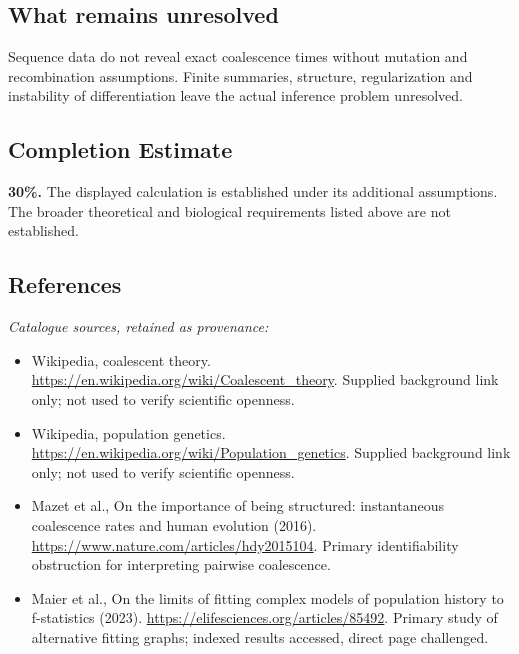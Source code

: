 \documentclass[11pt]{article}
\begin{document}
\subsection{What remains unresolved}
Sequence data do not reveal exact coalescence times without mutation and recombination assumptions. Finite summaries, structure, regularization and instability of differentiation leave the actual inference problem unresolved.
\subsection{Completion Estimate}
\textbf{30\%.} The displayed calculation is established under its additional assumptions. The broader theoretical and biological requirements listed above are not established.
\subsection{References}
\noindent\emph{Catalogue sources, retained as provenance:}
\begin{itemize}
\item Wikipedia, coalescent theory. \url{https://en.wikipedia.org/wiki/Coalescent_theory}. Supplied background link only; not used to verify scientific openness.
\item Wikipedia, population genetics. \url{https://en.wikipedia.org/wiki/Population_genetics}. Supplied background link only; not used to verify scientific openness.
\item Mazet et al., On the importance of being structured: instantaneous coalescence rates and human evolution (2016). \url{https://www.nature.com/articles/hdy2015104}. Primary identifiability obstruction for interpreting pairwise coalescence.
\item Maier et al., On the limits of fitting complex models of population history to f-statistics (2023). \url{https://elifesciences.org/articles/85492}. Primary study of alternative fitting graphs; indexed results accessed, direct page challenged.
\end{itemize}
\clearpage


\appendix
\end{document}
